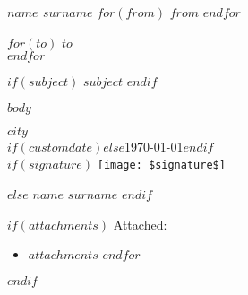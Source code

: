 \documentclass[$if(fontsize)$$fontsize$,$endif$$if(papersize)$$papersize$paper,$else$a4paper,$endif$]{article}
\begin{document}
\footnotesize
\textsc{\textbf{$name$ $surname$}}
$for(from)$
\textbullet{} \textsc{$from$}
$endfor$

\vspace{5em}

\normalsize \sffamily
$for(to)$
$to$\\
$endfor$

\vspace{2em}

\rmfamily

$if(subject)$
\textbf{$subject$}
$endif$

\vspace{1em}

$body$

\begin{FlushRight}
  $city$ \\
  $if(customdate)$$else$\today$endif$ \\
  $if(signature)$
  \texttt{[image: \$signature\$]} \par
  $else$
  $name$ \textsc{$surname$}
  $endif$
\end{FlushRight}

$if(attachments)$
\color{Gray}
\small \sffamily
Attached:
\footnotesize \itshape
\begin{itemize}
  $for(attachments)$
\item $attachments$
  $endfor$
\end{itemize}
$endif$
\end{document}
